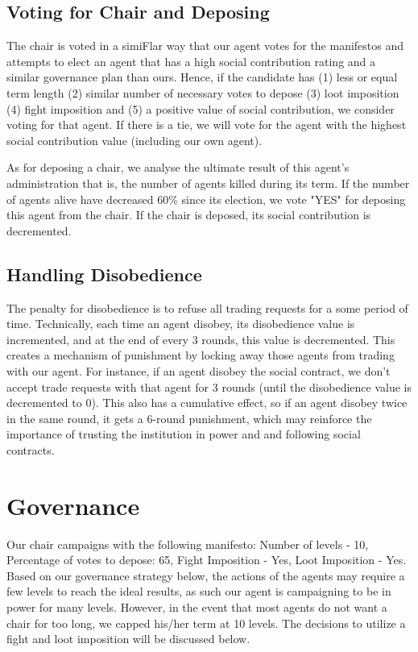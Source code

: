 \subsection{Voting for Chair and Deposing}

\par The chair is voted in a simiFlar way that our agent votes for the manifestos and attempts to elect an agent that has a high social contribution rating and a similar governance plan than ours. Hence, if the candidate has (1) less or equal term length (2) similar number of necessary votes to depose (3) loot imposition (4) fight imposition and (5) a positive value of social contribution, we consider voting for that agent. If there is a tie, we will vote for the agent with the highest social contribution value (including our own agent).

\par As for deposing a chair, we analyse the ultimate result of this agent's administration that is, the number of agents killed during its term. If the number of agents alive have decreased 60\% since its election, we vote "YES" for deposing this agent from the chair. If the chair is deposed, its social contribution is decremented.



\subsection{Handling Disobedience}

\par The penalty for disobedience is to refuse all trading requests for a some period of time. Technically, each time an agent disobey, its disobedience value is incremented, and at the end of every 3 rounds, this value is decremented. This creates a mechanism of punishment by locking away those agents from trading with our agent. For instance, if an agent disobey the social contract, we don't accept trade requests with that agent for 3 rounds (until the disobedience value is decremented to 0). This also has a cumulative effect, so if an agent disobey twice in the same round, it gets a 6-round punishment, which may reinforce the importance of trusting the institution in power and and following social contracts. 

\section{Governance}
\par Our chair campaigns with the following manifesto: Number of levels - 10, Percentage of votes to depose: 65, Fight Imposition - Yes, Loot Imposition - Yes. Based on our governance strategy below, the actions of the agents may require  a few levels to reach the ideal results, as such our agent is campaigning to be in power for many levels. However, in the event that most agents do not want a chair for too long, we capped his/her term at 10 levels. The decisions to utilize a fight and loot imposition will be discussed below.
 
